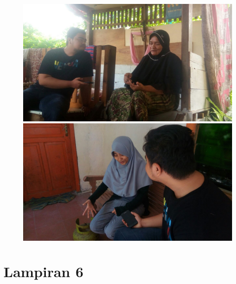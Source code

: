 \begin{figure}[H]
	\includegraphics [width = 12cm]{gambar/wawancara/wawancara5}
	\includegraphics [width = 12cm]{gambar/wawancara/wawancara6}
\end{figure}






\chapter*{Lampiran 6}

